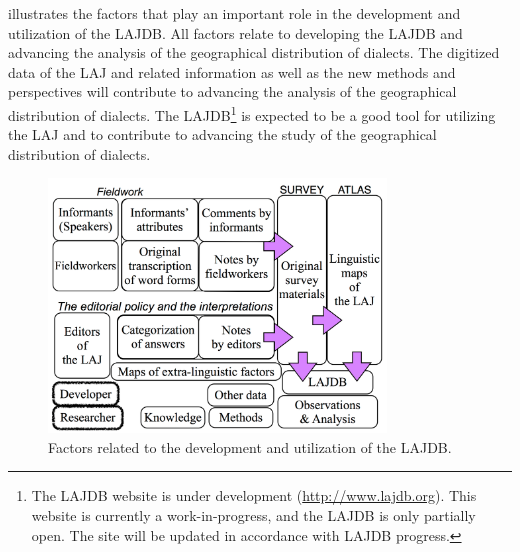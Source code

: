 \documentclass[output=paper]{LSP/langsci}
\begin{document}
\newpage
{} illustrates the factors that play an important role in the development and utilization of the LAJDB. All factors relate to developing the LAJDB and advancing the analysis of the geographical distribution of dialects. The digitized data of the LAJ and related information as well as the new methods and perspectives will contribute to advancing the analysis of the geographical distribution of dialects. The LAJDB\footnote{The LAJDB website is under development (\url{http://www.lajdb.org}). This website is currently a work-in-progress, and the LAJDB is only partially open. The site will be updated in accordance with LAJDB progress.} is expected to be a good tool for utilizing the LAJ and to contribute to advancing the study of the geographical distribution of dialects. 

\begin{figure}[t]
\includegraphics[width=0.8\textwidth]{illustrations/kuma_fig26}
\caption{Factors related to the development and utilization of the LAJDB.}
\label{fig:kuma:26}
\end{figure}  
\end{document}
